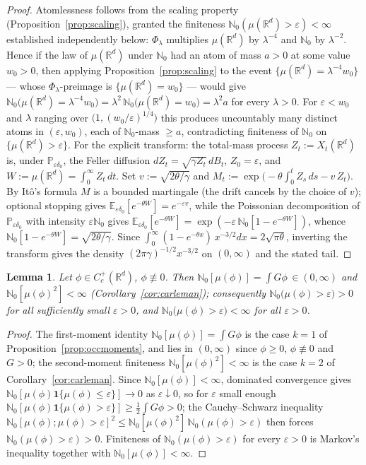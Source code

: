 \documentclass[11pt]{article}
\newtheorem{lemma}[theorem]{Lemma}
\theoremstyle{definition}
\theoremstyle{remark}
\newcommand{\R}{\mathbb{R}}
\newcommand{\E}{\mathbb{E}}
\newcommand{\bP}{\mathbb{P}}
\newcommand{\bN}{{\mathbb{N}_0}}                 %
\newcommand{\Cc}{C_c^+(\R^d)}
\newcommand{\eps}{\varepsilon}
\numberwithin{equation}{section}
\theoremstyle{plain}
\theoremstyle{definition}
\theoremstyle{remark}
\theoremstyle{plain}
\begin{document}
\begin{proof}
Atomlessness follows from the scaling property
(Proposition~\ref{prop:scaling}), granted the finiteness $\bN(\mu(\R^d)>\eps)<\infty$ established independently below: $\Phi_\lambda$ multiplies
$\mu(\R^d)$ by $\lambda^{-4}$ and $\bN$ by $\lambda^{-2}$. Hence if the law
of $\mu(\R^d)$ under $\bN$ had an atom of mass $a>0$ at some value $w_0>0$,
then applying Proposition~\ref{prop:scaling} to the event
$\{\mu(\R^d)=\lambda^{-4}w_0\}$ --- whose $\Phi_\lambda$-preimage is
$\{\mu(\R^d)=w_0\}$ --- would give
$\bN\bigl(\mu(\R^d)=\lambda^{-4}w_0\bigr)
=\lambda^{2}\,\bN\bigl(\mu(\R^d)=w_0\bigr)=\lambda^{2}a$ for every
$\lambda>0$. For $\eps<w_0$ and $\lambda$ ranging over
$\bigl(1,(w_0/\eps)^{1/4}\bigr)$ this produces uncountably many distinct
atoms in $(\eps,w_0)$, each of $\bN$-mass $\ge a$, contradicting finiteness
of $\bN$ on $\{\mu(\R^d)>\eps\}$. For the explicit transform:
the total-mass process $Z_t:=X_t(\R^d)$ is, under $\bP_{\eps\delta_0}$, the
Feller diffusion $dZ_t=\sqrt{\gamma Z_t}\,dB_t$, $Z_0=\eps$, and
$W:=\mu(\R^d)=\int_0^\infty Z_t\,dt$. Set $v:=\sqrt{2\theta/\gamma}$ and
$M_t:=\exp\bigl(-\theta\int_0^t Z_s\,ds- v\,Z_t\bigr)$.
By It\^o's formula $M$ is a bounded martingale (the drift cancels by the
choice of $v$); optional stopping gives
$\E_{\eps\delta_0}[e^{-\theta W}]=e^{-\eps v}$, while the Poissonian
decomposition of $\bP_{\eps\delta_0}$ with intensity $\eps\bN$ gives
$\E_{\eps\delta_0}[e^{-\theta W}]=\exp(-\eps\,\bN[1-e^{-\theta W}])$, whence
$\bN[1-e^{-\theta W}]=\sqrt{2\theta/\gamma}$. Since
$\int_0^\infty(1-e^{-\theta x})\,x^{-3/2}dx=2\sqrt{\pi\theta}$, inverting the
transform gives the density $(2\pi\gamma)^{-1/2}x^{-3/2}$ on $(0,\infty)$ and
the stated tail.
\end{proof}



\begin{lemma}\label{lem:PZ}
Let $\phi\in\Cc$, $\phi\not\equiv0$. Then $\bN[\mu(\phi)]=\int G\phi\,
\in(0,\infty)$ and $\bN[\mu(\phi)^2]<\infty$
(Corollary~\ref{cor:carleman}); consequently
$\bN\bigl(\mu(\phi)>\eps\bigr)>0$ for all sufficiently small $\eps>0$, and
$\bN\bigl(\mu(\phi)>\eps\bigr)<\infty$ for all $\eps>0$.
\end{lemma}

\begin{proof}
The first-moment identity $\bN[\mu(\phi)]=\int G\phi$ is the case
$k=1$ of Proposition~\ref{prop:occmoments}, and lies in $(0,\infty)$ since
$\phi\ge0$, $\phi\not\equiv0$ and $G>0$; the second-moment finiteness
$\bN[\mu(\phi)^2]<\infty$ is the case $k=2$ of
Corollary~\ref{cor:carleman}. Since $\bN[\mu(\phi)]<\infty$, dominated
convergence gives $\bN[\mu(\phi)\mathbf 1\{\mu(\phi)\le\eps\}]\to0$ as
$\eps\downarrow0$, so for $\eps$ small enough
$\bN[\mu(\phi)\mathbf 1\{\mu(\phi)>\eps\}]\ge\tfrac12\int G\phi>0$; the
Cauchy--Schwarz inequality
$\bN[\mu(\phi);\mu(\phi)>\eps]^2\le\bN[\mu(\phi)^2]\,\bN(\mu(\phi)>\eps)$ then
forces $\bN(\mu(\phi)>\eps)>0$. Finiteness of $\bN(\mu(\phi)>\eps)$ for every
$\eps>0$ is Markov's inequality together with $\bN[\mu(\phi)]<\infty$.
\end{proof}
\end{document}
